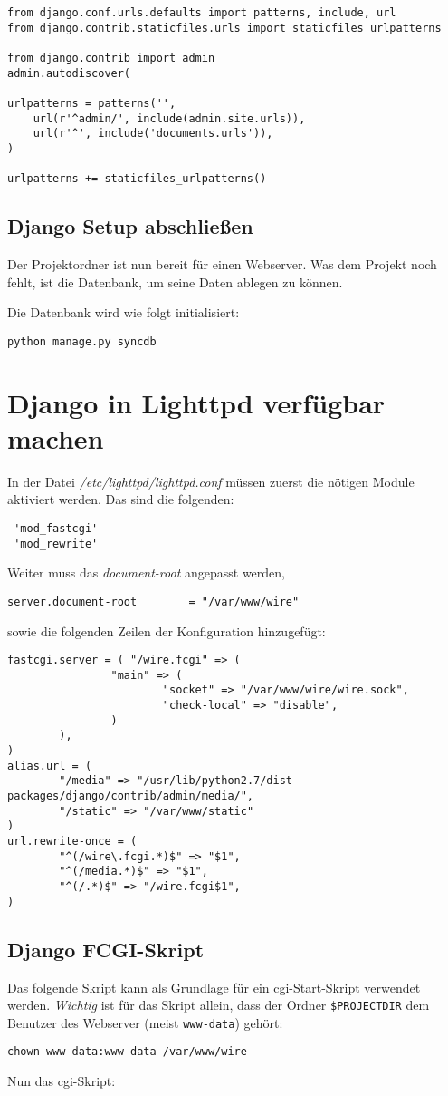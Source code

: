 \begin{lstlisting}
from django.conf.urls.defaults import patterns, include, url
from django.contrib.staticfiles.urls import staticfiles_urlpatterns

from django.contrib import admin
admin.autodiscover(

urlpatterns = patterns('',
    url(r'^admin/', include(admin.site.urls)),
    url(r'^', include('documents.urls')),
)

urlpatterns += staticfiles_urlpatterns()
\end{lstlisting}

 \subsection{Django Setup abschließen}
 Der Projektordner ist nun bereit für einen Webserver. Was dem Projekt noch
 fehlt, ist die Datenbank, um seine Daten ablegen zu können.

 Die Datenbank wird wie folgt initialisiert:
\begin{lstlisting}
python manage.py syncdb
\end{lstlisting}

\section{Django in Lighttpd verfügbar machen}
In der Datei \emph{/etc/lighttpd/lighttpd.conf} müssen zuerst die nötigen
Module aktiviert werden. Das sind die folgenden:
\begin{lstlisting}
 'mod_fastcgi'
 'mod_rewrite'
\end{lstlisting}

Weiter muss das \emph{document-root} angepasst werden,
\begin{lstlisting}
server.document-root        = "/var/www/wire"
\end{lstlisting}
sowie die folgenden Zeilen der Konfiguration hinzugefügt:
\begin{lstlisting}
fastcgi.server = ( "/wire.fcgi" => (
                "main" => (
                        "socket" => "/var/www/wire/wire.sock",
                        "check-local" => "disable",
                )
        ),
)
alias.url = (
        "/media" => "/usr/lib/python2.7/dist-packages/django/contrib/admin/media/",
        "/static" => "/var/www/static"
)
url.rewrite-once = (
        "^(/wire\.fcgi.*)$" => "$1",
        "^(/media.*)$" => "$1",
        "^(/.*)$" => "/wire.fcgi$1",
)
\end{lstlisting}

 \subsection{Django FCGI-Skript}
Das folgende Skript kann als Grundlage für ein \Gls{cgi}-Start-Skript verwendet
werden. \emph{Wichtig} ist für das Skript allein, dass der Ordner
\lstinline{$PROJECTDIR} dem Benutzer des Webserver (meist \lstinline{www-data})
gehört:

\begin{lstlisting}
chown www-data:www-data /var/www/wire
\end{lstlisting}

Nun das \Gls{cgi}-Skript:

